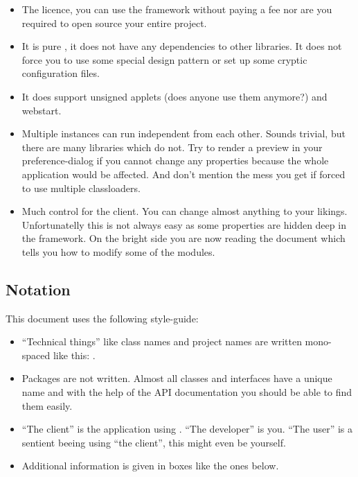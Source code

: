 \begin{itemize}
 \item The licence, you can use the framework without paying a fee nor are you required to open source your entire project.
 \item It is pure , it does not have any dependencies to other libraries. It does not force you to use some special design pattern or set up some cryptic configuration files.
 \item It does support unsigned applets (does anyone use them anymore?) and webstart.
 \item Multiple instances can run independent from each other. Sounds trivial, but there are many libraries which do not. Try to render a preview in your preference-dialog if you cannot change any properties because the whole application would be affected. And don't mention the mess you get if forced to use multiple classloaders.
 \item Much control for the client. You can change almost anything to your likings. Unfortunatelly this is not always easy as some properties are hidden deep in the framework. On the bright side you are now reading the document which tells you how to modify some of the modules.
\end{itemize}


\subsection{Notation}
This document uses the following style-guide:

\begin{itemize}
 \item ``Technical things'' like class names and project names are written mono-spaced like this: .
 \item Packages are not written. Almost all classes and interfaces have a unique name and with the help of the API documentation you should be able to find them easily.
 \item ``The client'' is the application using . ``The developer'' is you. ``The user'' is a sentient beeing using ``the client'', this might even be yourself.
 \item Additional information is given in boxes like the ones below.
\end{itemize}



